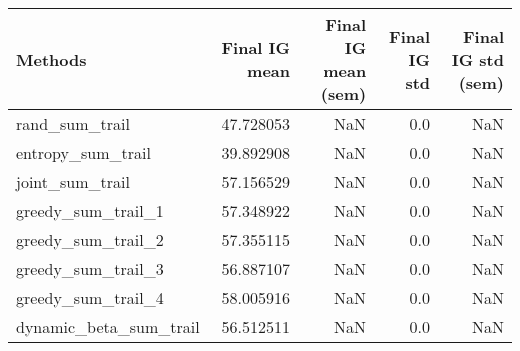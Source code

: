 \begin{tabular}{lrrrr}
\toprule
                Methods &  Final IG mean &  Final IG mean (sem) &  Final IG std &  Final IG std (sem) \\
\midrule
         rand\_sum\_trail &      47.728053 &                  NaN &           0.0 &                 NaN \\
      entropy\_sum\_trail &      39.892908 &                  NaN &           0.0 &                 NaN \\
        joint\_sum\_trail &      57.156529 &                  NaN &           0.0 &                 NaN \\
     greedy\_sum\_trail\_1 &      57.348922 &                  NaN &           0.0 &                 NaN \\
     greedy\_sum\_trail\_2 &      57.355115 &                  NaN &           0.0 &                 NaN \\
     greedy\_sum\_trail\_3 &      56.887107 &                  NaN &           0.0 &                 NaN \\
     greedy\_sum\_trail\_4 &      58.005916 &                  NaN &           0.0 &                 NaN \\
 dynamic\_beta\_sum\_trail &      56.512511 &                  NaN &           0.0 &                 NaN \\
\bottomrule
\end{tabular}
